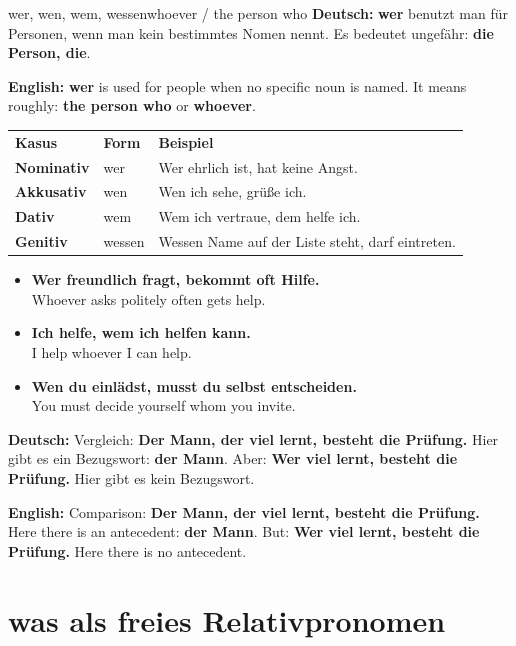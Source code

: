 \documentclass[a4paper,11pt]{article}
\newcommand{\GermanText}[1]{\textbf{Deutsch: }#1\par}
\newcommand{\EnglishText}[1]{{\small\color{SoftGray}\textbf{English: }#1\par}}
\newcommand{\ExampleItem}[2]{\item \textbf{#1}\\{\small\color{SoftGray}#2}}
\begin{document}
\begin{grammarentry}{wer, wen, wem, wessen}{whoever / the person who}
\GermanText{\textbf{wer} benutzt man für Personen, wenn man kein bestimmtes Nomen nennt. Es bedeutet ungefähr: \textbf{die Person, die}.}
\EnglishText{\textbf{wer} is used for people when no specific noun is named. It means roughly: \textbf{the person who} or \textbf{whoever}.}

\begin{center}
\begin{tabular}{>{\bfseries}p{3cm}p{4cm}p{7cm}}
\rowcolor{HeaderBlueDark}
\color{white}\textbf{Kasus} & \color{white}\textbf{Form} & \color{white}\textbf{Beispiel} \\
Nominativ & wer & Wer ehrlich ist, hat keine Angst. \\
Akkusativ & wen & Wen ich sehe, grüße ich. \\
Dativ & wem & Wem ich vertraue, dem helfe ich. \\
Genitiv & wessen & Wessen Name auf der Liste steht, darf eintreten. \\
\end{tabular}
\end{center}

\begin{exbox}
\begin{itemize}
    \ExampleItem{Wer freundlich fragt, bekommt oft Hilfe.}{Whoever asks politely often gets help.}
    \ExampleItem{Ich helfe, wem ich helfen kann.}{I help whoever I can help.}
    \ExampleItem{Wen du einlädst, musst du selbst entscheiden.}{You must decide yourself whom you invite.}
\end{itemize}
\end{exbox}

\GermanText{Vergleich: \textbf{Der Mann, der viel lernt, besteht die Prüfung.} Hier gibt es ein Bezugswort: \textbf{der Mann}. Aber: \textbf{Wer viel lernt, besteht die Prüfung.} Hier gibt es kein Bezugswort.}
\EnglishText{Comparison: \textbf{Der Mann, der viel lernt, besteht die Prüfung.} Here there is an antecedent: \textbf{der Mann}. But: \textbf{Wer viel lernt, besteht die Prüfung.} Here there is no antecedent.}
\end{grammarentry}

\section{was als freies Relativpronomen}
\end{document}
